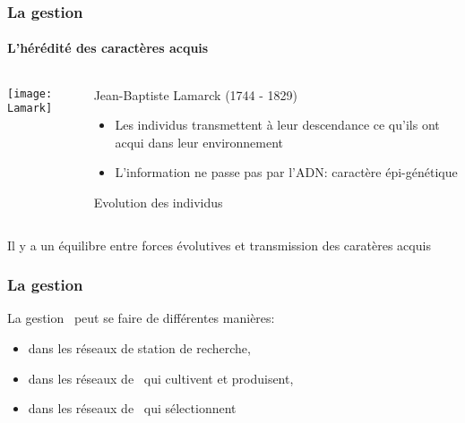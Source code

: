 \begin{frame}
\frametitle{La gestion \insitu}
\framesubtitle{L'hérédité des caractères acquis}

\begin{columns}

\begin{column}{.5\textwidth}
\centering
\texttt{[image: Lamark]}
\end{column}


\begin{column}{.5\textwidth}

Jean-Baptiste Lamarck (1744 - 1829)

\begin{itemize}
\item Les individus transmettent à leur descendance ce qu'ils ont acqui dans leur environnement
\item L'information ne passe pas par l'ADN: caractère épi-génétique
\end{itemize}

\begin{block}{}
\centering
Evolution des individus
\end{block}

\end{column}

\end{columns}

\begin{overprint}

\begin{block}{}
\centering
\Large
Il y a un équilibre entre forces évolutives et transmission des caratères acquis
\end{block}

\end{overprint}



\end{frame}


\begin{frame}
\frametitle{La gestion \insitu}

La gestion \insitu~peut se faire de différentes manières:

\begin{itemize}
\item dans les réseaux de station de recherche,
\item dans les réseaux de \MSPs~qui cultivent et produisent,
\item dans les réseaux de \MSPs~qui sélectionnent
\end{itemize}


\end{frame}

